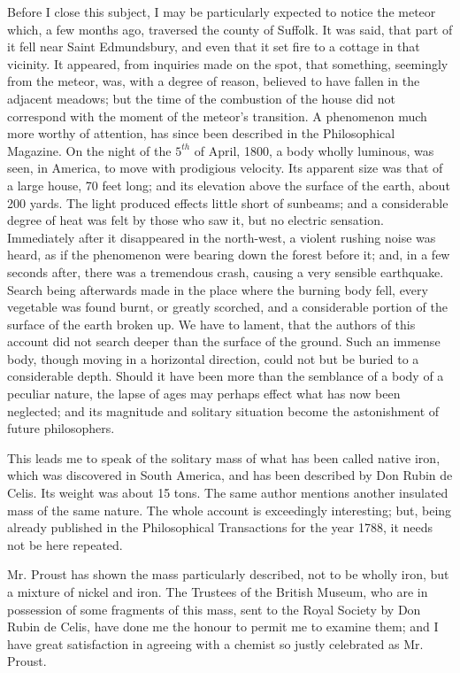 \documentclass[a4paper, 12pt, oneside]{article}
\begin{document}
Before I close this subject, I may be particularly expected to notice the meteor which, a few months ago, traversed the county of Suffolk. It was said, that part of it fell near Saint Edmundsbury, and even that it set fire to a cottage in that vicinity. It appeared, from inquiries made on the spot, that something, seemingly from the meteor, was, with a degree of reason, believed to have fallen in the adjacent meadows; but the time of the combustion of the house did not correspond with the moment of the meteor's transition. A phenomenon much more worthy of attention, has since been described in the Philosophical Magazine. On the night of the $5^{th}$ of April, 1800, a body wholly luminous, was seen, in America, to move with prodigious velocity. Its apparent size was that of a large house, 70 feet long; and its elevation above the surface of the earth, about 200 yards. The light produced effects little short of sunbeams; and a considerable degree of heat was felt by those who saw it, but no electric sensation. Immediately after it disappeared in the north-west, a violent rushing noise was heard, as if the phenomenon were bearing down the forest before it; and, in a few seconds after, there was a tremendous crash, causing a very sensible earthquake. Search being afterwards made in the place where the burning body fell, every vegetable was found burnt, or greatly scorched, and a considerable portion of the surface of the earth broken up. We have to lament, that the authors of this account did not search deeper than the surface of the ground. Such an immense body, though moving in a horizontal direction, could not but be buried to a considerable depth. Should it have been more than the semblance of a body of a peculiar nature, the lapse of ages may perhaps effect what has now been neglected; and its magnitude and solitary situation become the astonishment of future philosophers.

This leads me to speak of the solitary mass of what has been called native iron, which was discovered in South America, and has been described by Don Rubin de Celis. Its weight was about 15 tons. The same author mentions another insulated mass of the same nature. The whole account is exceedingly interesting; but, being already published in the Philosophical Transactions for the year 1788, it needs not be here repeated.

Mr. Proust has shown the mass particularly described, not to be wholly iron, but a mixture of nickel and iron. The Trustees of the British Museum, who are in possession of some fragments of this mass, sent to the Royal Society by Don Rubin de Celis, have done me the honour to permit me to examine them; and I have great satisfaction in agreeing with a chemist so justly celebrated as Mr. Proust.
\end{document}
